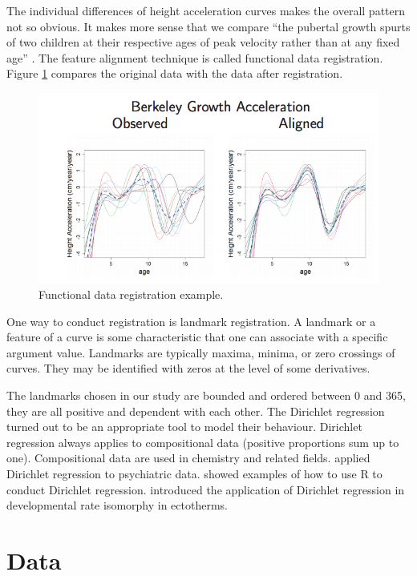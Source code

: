\documentclass{article}\usepackage[]{graphicx}\usepackage[]{color}
\begin{document}
The individual differences of height acceleration curves makes the overall pattern not so obvious. It makes more sense that we compare ``the pubertal growth spurts of two children at their respective ages of peak velocity rather than at any fixed age'' \citep{ramsay2006functional}. The feature alignment technique is called functional data registration. Figure \ref{Fig:fdaregi} compares the original data with the data after registration.

\begin{figure}[!ht]
\centering
\includegraphics[width=14cm]{egregistration.png}
\caption{Functional data registration example. \citep{FDAGiles}}
\label{Fig:fdaregi}
\end{figure}

One way to conduct registration is landmark registration. 
A landmark or a feature of a curve is some characteristic that one can associate with a specific argument value. Landmarks are typically maxima, minima, or zero crossings of curves.
They may be identified with zeros at the level of some derivatives.

The landmarks chosen in our study are bounded and ordered between 0 and 365, they are all positive and dependent with each other. The Dirichlet regression \citep{hijazi2009modelling} turned out to be an appropriate tool to model their behaviour. Dirichlet regression always applies to compositional data (positive proportions sum up to one). Compositional data are used in chemistry  and related fields.  \citet{gueorguieva2008dirichlet} applied Dirichlet regression to psychiatric data.  \citet{maier2014dirichletreg} showed examples of how to use R to conduct Dirichlet regression. \citet{boukal2015analyses} introduced the application of Dirichlet regression in developmental rate isomorphy in ectotherms. 


\section{Data}\label{Sec:Data}
\end{document}
